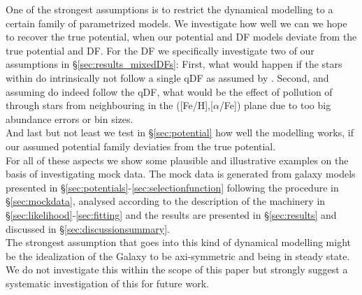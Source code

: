 One of the strongest assumptions is to restrict the dynamical modelling to a certain family of parametrized models. We investigate how well we can we hope to recover the true potential, when our potential and DF models deviate from the true potential and DF. For the DF we specifically investigate two of our assumptions in \S\ref{sec:results_mixedDFs}: First, what would happen if the stars within \MAPs do intrinsically not follow a single qDF as assumed by \cite{tin13,bov13}. Second, and assuming \MAPs do indeed follow the qDF, what would be the effect of pollution of \MAPs through stars from neighbouring \MAPs in the ([Fe/H],[$\alpha$/Fe]) plane due to too big abundance errors or bin sizes.\\
And last but not least we test in \S\ref{sec:potential} how well the modelling works, if our assumed potential family deviaties from the true potential. \\

For all of these aspects we show some plausible and illustrative examples on the basis of investigating mock data. The mock data is generated from galaxy models presented in \S\ref{sec:potentials}-\ref{sec:selectionfunction} following the procedure in \S\ref{sec:mockdata}, analysed according to the description of the machinery in \S\ref{sec:likelihood}-\ref{sec:fitting} and the results are presented in \S\ref{sec:results} and discussed in \S\ref{sec:discussionsummary}.\\

The strongest assumption that goes into this kind of dynamical modelling might be the idealization of the Galaxy to be axi-symmetric and being in steady state. We do not investigate this within the scope of this paper but strongly suggest a systematic investigation of this for future work.


